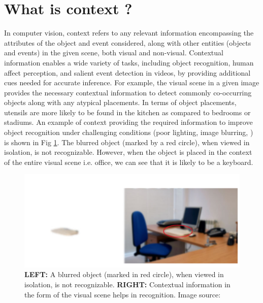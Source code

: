 \section{What is context ?}
In computer vision, context \cite{contextvision} refers to any relevant information encompassing the attributes of the object and event considered, along with other entities (objects and events) in the given scene, both visual and non-visual. Contextual information enables a wide variety of tasks, including object recognition, human affect perception, and salient event detection in videos, by providing additional cues needed for accurate inference. For example, the visual scene in a given image provides the necessary contextual information to detect commonly co-occurring objects along with any atypical placements. In terms of object placements, utensils are more likely to be found in the kitchen as compared to bedrooms or stadiums. An example of context providing the required information to improve object recognition under challenging conditions (poor lighting, image blurring, ) is shown in Fig \ref{object recognition}. The blurred object (marked by a red circle), when viewed in isolation, is not recognizable. However, when the object is placed in the context of the entire visual scene i.e. office, we can see that it is likely to be a keyboard.
\begin{figure}
    \centering 
     \includegraphics[width=0.6\linewidth]{figures/blurred_object.png}
     \caption{ \textbf{LEFT:} A blurred object (marked in red circle), when viewed in isolation, is not recognizable. \textbf{RIGHT:} Contextual information in the form of the visual scene helps in recognition. Image source: \cite{Marques2010ContextMI}}
     \label{object recognition}
\end{figure}

